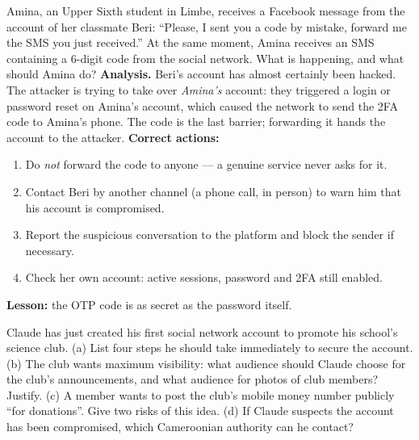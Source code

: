 \documentclass[11pt]{article}
\begin{document}
\begin{exoresolu}
Amina, an Upper Sixth student in Limbe, receives a Facebook message from the account of her classmate Beri: ``Please, I sent you a code by mistake, forward me the SMS you just received.'' At the same moment, Amina receives an SMS containing a 6-digit code from the social network. What is happening, and what should Amina do?
\tcblower
\textbf{Analysis.} Beri's account has almost certainly been hacked. The attacker is trying to take over \emph{Amina's} account: they triggered a login or password reset on Amina's account, which caused the network to send the 2FA code to Amina's phone. The code is the last barrier; forwarding it hands the account to the attacker.
\textbf{Correct actions:}
\begin{enumerate}
\item Do \emph{not} forward the code to anyone --- a genuine service never asks for it.
\item Contact Beri by another channel (a phone call, in person) to warn him that his account is compromised.
\item Report the suspicious conversation to the platform and block the sender if necessary.
\item Check her own account: active sessions, password and 2FA still enabled.
\end{enumerate}
\textbf{Lesson:} the OTP code is as secret as the password itself.
\end{exoresolu}

\begin{exercice}
Claude has just created his first social network account to promote his school's science club. (a) List four steps he should take immediately to secure the account. (b) The club wants maximum visibility: what audience should Claude choose for the club's announcements, and what audience for photos of club members? Justify. (c) A member wants to post the club's mobile money number publicly ``for donations''. Give two risks of this idea. (d) If Claude suspects the account has been compromised, which Cameroonian authority can he contact?
\end{exercice}
\end{document}
